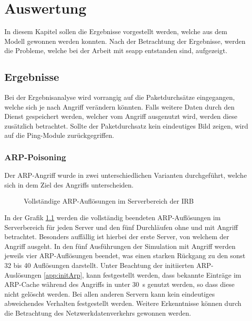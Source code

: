 \chapter{Auswertung} \label{chap:auswertung5}
In diesem Kapitel sollen die Ergebnisse vorgestellt werden, welche aus dem Modell gewonnen werden konnten. Nach der Betrachtung der Ergebnisse, werden die Probleme, welche bei der Arbeit mit \gls{seapp} entstanden sind, aufgezeigt.

\section{Ergebnisse}
Bei der Ergebnisanalyse wird vorrangig auf die Paketdurchsätze  eingegangen, welche sich je nach Angriff verändern könnten. Falls weitere Daten durch den Dienst gespeichert werden, welcher vom Angriff ausgenutzt wird, werden diese zusätzlich betrachtet. Sollte der Paketdurchsatz kein eindeutiges Bild zeigen, wird auf die Ping-Module zurückgegriffen.

\subsection{ARP-Poisoning}
Der ARP-Angriff wurde in zwei unterschiedlichen Varianten durchgeführt, welche sich in dem Ziel des Angriffs unterscheiden. 
 
\begin{figure}[ht]
	\centering
	
	\caption[Vollständige ARP-Auflösungen]{Vollständige ARP-Auflösungen im Serverbereich der IRB}
	\label{fig:arpAngriffKomplett}
\end{figure}
 
In der Grafik \ref{fig:arpAngriffKomplett} werden die vollständig beendeten ARP-Auflösungen im Serverbereich für jeden Server und den fünf Durchläufen ohne und mit Angriff betrachtet. Besonders auffällig ist hierbei der erste Server, von welchem der Angriff ausgeht. In den fünf Ausführungen der Simulation mit Angriff werden jeweils vier ARP-Auflösungen beendet, was einen starken Rückgang zu den sonst 32 bis 40 Auflösungen darstellt. Unter Beachtung der initiierten ARP-Auslösungen \ref{app:initArp}, kann festgestellt werden, dass bekannte Einträge im ARP-Cache während des Angriffs in unter \SI{30}{\second} genutzt werden, so dass diese nicht gelöscht werden. Bei allen anderen Servern kann kein eindeutiges abweichendes Verhalten festgestellt werden. Weitere Erkenntnisse können durch die Betrachtung des Netzwerkdatenverkehrs gewonnen werden.

